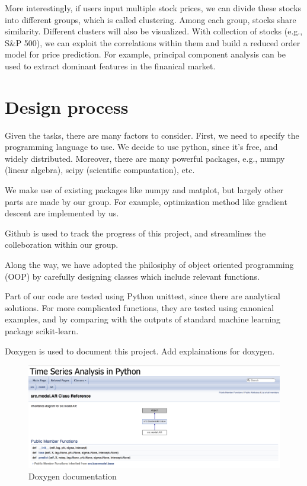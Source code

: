 \documentclass[12pt,a4paper]{article}
\begin{document}
More interestingly, if users input multiple stock prices, we can divide these stocks into different groups, which is called clustering. Among each group, stocks share similarity. Different clusters will also be visualized. With collection of stocks (e.g., S\&P 500), we can exploit the correlations within them and build a reduced order model for price prediction. For example, principal component analysis can be used to extract dominant features in the finanical market.

\section{Design process}
Given the tasks, there are many factors to consider. First, we need to specify the programming language to use. We decide to use python, since it's free, and widely distributed. Moreover, there are many powerful packages, e.g., numpy (linear algebra), scipy (scientific compuatation), etc.

We make use of existing packages like numpy and matplot, but largely other parts are made by our group. For example, optimization method like gradient descent are implemented by us.

Github is used to track the progress of this project, and streamlines the colleboration within our group.

Along the way, we have adopted the philosiphy of object oriented programming (OOP) by carefully designing classes which include relevant functions.

Part of our code are tested using Python unittest, since there are analytical solutions. For more complicated functions, they are tested using canonical examples, and by comparing with the outputs of standard machine learning package scikit-learn.

Doxygen is used to document this project. Add explainations for doxygen.
\begin{figure}[H]
        \centering
     \includegraphics[width=.7\linewidth]{./Figure/Doxygen.png}
\caption{Doxygen documentation}
\end{figure}
\end{document}
